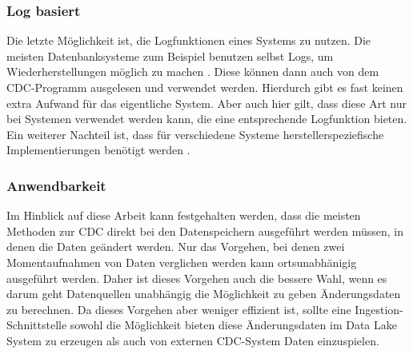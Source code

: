 \subsubsection{Log basiert}
Die letzte Möglichkeit ist, die Logfunktionen eines Systems zu nutzen.
Die meisten Datenbanksysteme zum Beispiel benutzen selbst Logs, um Wiederherstellungen möglich zu machen \cite{delta-view_gen}.
Diese können dann auch von dem CDC-Programm ausgelesen und verwendet werden.
Hierdurch gibt es fast keinen extra Aufwand für das eigentliche System.
Aber auch hier gilt, dass diese Art nur bei Systemen verwendet werden kann, die eine entsprechende Logfunktion bieten.
Ein weiterer Nachteil ist, dass für verschiedene Systeme herstellerspeziefische Implementierungen benötigt werden \cite{delta-view_gen}.

\subsubsection{Anwendbarkeit}

Im Hinblick auf diese Arbeit kann festgehalten werden, dass die meisten Methoden zur CDC direkt bei den Datenspeichern ausgeführt werden müssen, in denen die Daten geändert werden.
Nur das Vorgehen, bei denen zwei Momentaufnahmen von Daten verglichen werden kann ortsunabhänigig ausgeführt werden.
Daher ist dieses Vorgehen auch die bessere Wahl, wenn es darum geht Datenquellen unabhängig die Möglichkeit zu geben Änderungsdaten zu berechnen.
Da dieses Vorgehen aber weniger effizient ist, sollte eine Ingestion-Schnittstelle sowohl die Möglichkeit bieten diese Änderungsdaten im Data Lake System zu erzeugen als auch von externen CDC-System Daten einzuspielen.